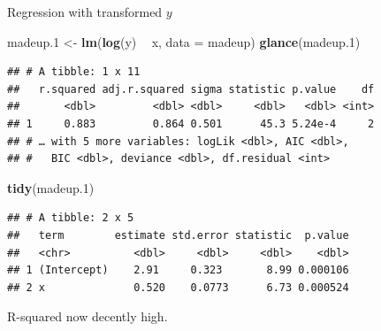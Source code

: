 \documentclass[ignorenonframetext,]{beamer}
\newenvironment{Shaded}{\begin{snugshade}}{\end{snugshade}}
\newcommand{\DataTypeTok}[1]{\textcolor[rgb]{0.13,0.29,0.53}{#1}}
\newcommand{\FloatTok}[1]{\textcolor[rgb]{0.00,0.00,0.81}{#1}}
\newcommand{\KeywordTok}[1]{\textcolor[rgb]{0.13,0.29,0.53}{\textbf{#1}}}
\newcommand{\NormalTok}[1]{#1}
\newcommand{\OperatorTok}[1]{\textcolor[rgb]{0.81,0.36,0.00}{\textbf{#1}}}
\newcommand{\StringTok}[1]{\textcolor[rgb]{0.31,0.60,0.02}{#1}}
\begin{document}
\begin{frame}[fragile]{Regression with transformed \(y\)}
\protect\hypertarget{regression-with-transformed-y}{}

\footnotesize

\begin{Shaded}
\begin{Highlighting}[]
\NormalTok{madeup}\FloatTok{.1}\NormalTok{ <-}\StringTok{ }\KeywordTok{lm}\NormalTok{(}\KeywordTok{log}\NormalTok{(y) }\OperatorTok{~}\StringTok{ }\NormalTok{x, }\DataTypeTok{data =}\NormalTok{ madeup)}
\KeywordTok{glance}\NormalTok{(madeup}\FloatTok{.1}\NormalTok{)}
\end{Highlighting}
\end{Shaded}

\begin{verbatim}
## # A tibble: 1 x 11
##   r.squared adj.r.squared sigma statistic p.value    df
##       <dbl>         <dbl> <dbl>     <dbl>   <dbl> <int>
## 1     0.883         0.864 0.501      45.3 5.24e-4     2
## # … with 5 more variables: logLik <dbl>, AIC <dbl>,
## #   BIC <dbl>, deviance <dbl>, df.residual <int>
\end{verbatim}

\begin{Shaded}
\begin{Highlighting}[]
\KeywordTok{tidy}\NormalTok{(madeup}\FloatTok{.1}\NormalTok{)}
\end{Highlighting}
\end{Shaded}

\begin{verbatim}
## # A tibble: 2 x 5
##   term        estimate std.error statistic  p.value
##   <chr>          <dbl>     <dbl>     <dbl>    <dbl>
## 1 (Intercept)    2.91     0.323       8.99 0.000106
## 2 x              0.520    0.0773      6.73 0.000524
\end{verbatim}

\normalsize

R-squared now decently high.

\end{frame}
\end{document}
